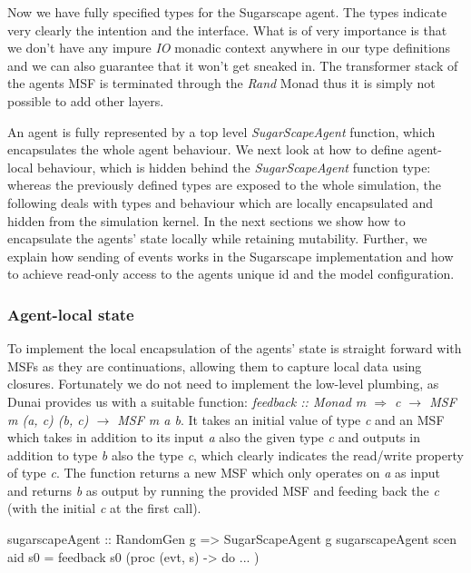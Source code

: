 Now we have fully specified types for the Sugarscape agent. The types indicate very clearly the intention and the interface. What is of very importance is that we don't have any impure \textit{IO} monadic context anywhere in our type definitions and we can also guarantee that it won't get sneaked in. The transformer stack of the agents MSF is terminated through the \textit{Rand} Monad thus it is simply not possible to add other layers. 

An agent is fully represented by a top level \textit{SugarScapeAgent} function, which encapsulates the whole agent behaviour. We next look at how to define agent-local behaviour, which is hidden behind the \textit{SugarScapeAgent} function type: whereas the previously defined types are exposed to the whole simulation, the following deals with types and behaviour which are locally encapsulated and hidden from the simulation kernel. In the next sections we show how to encapsulate the agents' state locally while retaining mutability. Further, we explain how sending of events works in the Sugarscape implementation and how to achieve read-only access to the agents unique id and the model configuration.

\subsubsection{Agent-local state}
To implement the local encapsulation of the agents' state is straight forward with MSFs as they are continuations, allowing them to capture local data using closures. Fortunately we do not need to implement the low-level plumbing, as Dunai provides us with a suitable function: \textit{feedback :: Monad m $\Rightarrow$ c $\rightarrow$ MSF m (a, c) (b, c) $\rightarrow$ MSF m a b}. It takes an initial value of type \textit{c} and an MSF which takes in addition to its input \textit{a} also the given type \textit{c} and outputs in addition to type \textit{b} also the type \textit{c}, which clearly indicates the read/write property of type \textit{c}. The function returns a new MSF which only operates on \textit{a} as input and returns \textit{b} as output by running the provided MSF and feeding back the \textit{c} (with the initial \textit{c} at the first call).

\begin{HaskellCode}
sugarscapeAgent :: RandomGen g => SugarScapeAgent g
sugarscapeAgent scen aid s0 = feedback s0 (proc (evt, s) -> do ... )
\end{HaskellCode}

